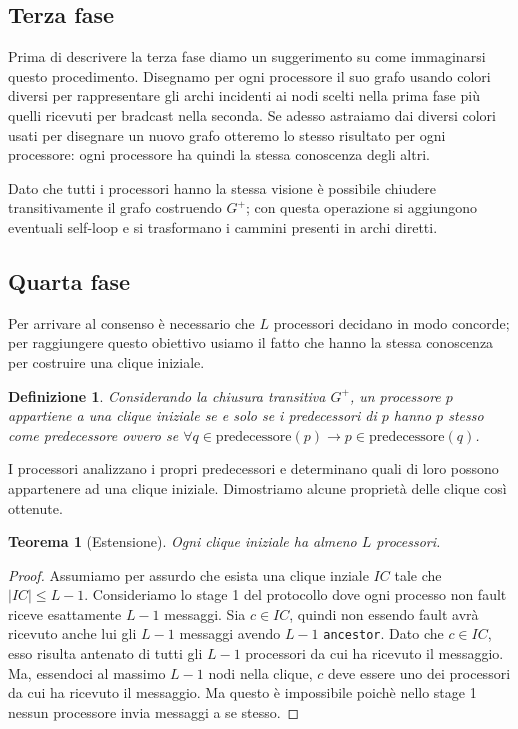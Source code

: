 \documentclass{article}
\newtheorem{definizione}{Definizione}
\newtheorem{teorema}{Teorema}
\begin{document}
\subsection{Terza fase}
Prima di descrivere la terza fase diamo un suggerimento su come immaginarsi questo procedimento. Disegnamo per ogni processore il suo grafo usando colori diversi per rappresentare gli archi incidenti ai nodi scelti nella prima fase più quelli ricevuti per bradcast nella seconda. Se adesso astraiamo dai diversi colori usati per disegnare un nuovo grafo otteremo lo stesso risultato per ogni processore: ogni processore ha quindi la stessa conoscenza degli altri.

Dato che tutti i processori hanno la stessa visione è possibile chiudere transitivamente il grafo costruendo $G^+$; con questa operazione si aggiungono eventuali self-loop e si trasformano i cammini presenti in archi diretti.

\subsection{Quarta fase}
Per arrivare al consenso è necessario che $L$ processori decidano in modo concorde; per raggiungere questo obiettivo usiamo il fatto che hanno la stessa conoscenza per costruire una clique iniziale. 
\begin{definizione}Considerando la chiusura transitiva $G^+$, un processore $p$ appartiene a una clique iniziale se e solo se i predecessori di $p$ hanno $p$ stesso come predecessore ovvero se $\forall q\in\mbox{predecessore}(p)\rightarrow p\in\mbox{predecessore}(q)$.\end{definizione}
I processori analizzano i propri predecessori e determinano quali di loro possono appartenere ad una clique iniziale. Dimostriamo alcune proprietà delle clique così ottenute.

\begin{teorema}[Estensione]Ogni clique iniziale ha almeno $L$ processori.\end{teorema}
\begin{proof}
Assumiamo per assurdo che esista una clique inziale $IC$ tale che $|IC|\leq L-1$.
Consideriamo lo stage 1 del protocollo dove ogni processo non fault riceve esattamente $L-1$ messaggi. Sia $c\in IC$, quindi non essendo fault avrà ricevuto anche lui gli $L-1$ messaggi avendo $L-1$ \texttt{ancestor}. Dato che $c \in IC$, esso risulta antenato di tutti gli $L-1$ processori da cui ha ricevuto il messaggio. Ma, essendoci al massimo $L-1$ nodi nella clique, $c$ deve essere uno dei processori da cui ha ricevuto il messaggio. Ma questo è impossibile poichè nello stage 1 nessun processore invia messaggi a se stesso.
\end{proof}
\end{document}
